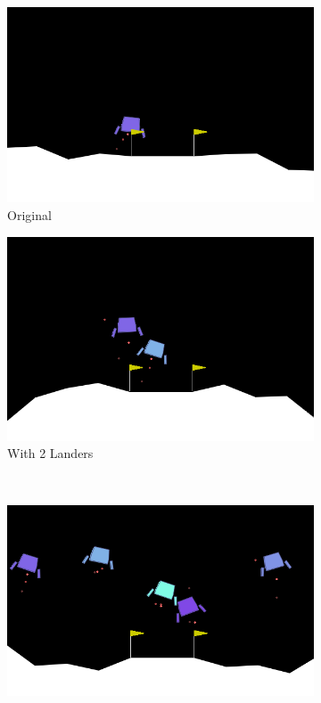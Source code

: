 \documentclass[12pt,letterpaper]{exam}
\begin{document}
\begin{figure}[h]
	\begin{subfigure}{.48\textwidth}
		\centering
		\includegraphics[width=.75\linewidth]{single_lander.png}
		\caption{Original}
		\label{fig:original}
	\end{subfigure}
	\begin{subfigure}{.48\textwidth}
		\centering
		\includegraphics[width=.75\linewidth]{dual_lander.png}
		\caption{With 2 Landers}
	\end{subfigure}
	\\
	\begin{subfigure}{.48\textwidth}
		\centering
		\includegraphics[width=.75\linewidth]{penta_lander_1.png}

\end{subfigure}
\end{figure}
\end{document}
